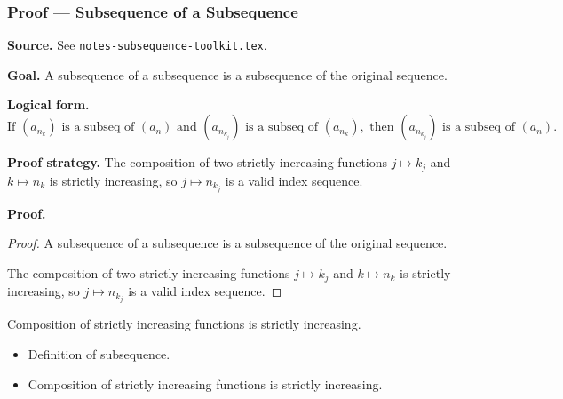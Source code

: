 
\clearpage
{}
\hypertarget{proof-RA-ABB-P-subseq-of-subseq}{}

\subsubsection[Subsequence of a Subsequence]{Proof --- Subsequence of a Subsequence}

\bigskip

\noindent
\textbf{Source.}
See \texttt{notes-subsequence-toolkit.tex}.

\vspace{0.75em}

\noindent
\textbf{Goal.}
A subsequence of a subsequence is a subsequence of the original sequence.

\vspace{0.75em}

\noindent
\textbf{Logical form.}
\[
  \text{If } (a_{n_k}) \text{ is a subseq of } (a_n) \text{ and } (a_{n_{k_j}}) \text{ is a subseq of } (a_{n_k}),\text{ then } (a_{n_{k_j}}) \text{ is a subseq of } (a_n).
\]

\vspace{0.75em}

\noindent
\textbf{Proof strategy.}
The composition of two strictly increasing functions $j \mapsto k_j$ and $k \mapsto n_k$ is strictly increasing, so $j \mapsto n_{k_j}$ is a valid index sequence.

\vspace{0.75em}

\noindent
\textbf{Proof.}
\begin{proof}
\Claim A subsequence of a subsequence is a subsequence of the original sequence.

\Given 

\Goal 

\Strategy The composition of two strictly increasing functions $j \mapsto k_j$ and $k \mapsto n_k$ is strictly increasing, so $j \mapsto n_{k_j}$ is a valid index sequence.

\medskip


\end{proof}

\begin{remark*}
Composition of strictly increasing functions is strictly increasing.
\end{remark*}

\begin{remark*}[Dependencies]
\begin{itemize}
  \item Definition of subsequence.
  \item Composition of strictly increasing functions is strictly increasing.
\end{itemize}
\end{remark*}
